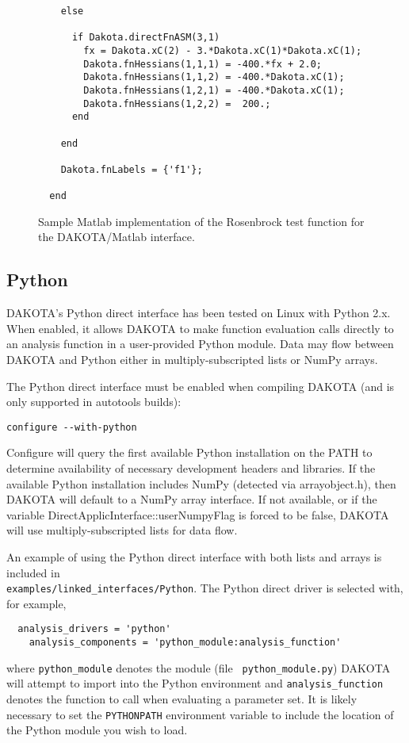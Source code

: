 \begin{figure}
\begin{bigbox}
\begin{tiny}
\begin{verbatim}
    else
    
      if Dakota.directFnASM(3,1) 
        fx = Dakota.xC(2) - 3.*Dakota.xC(1)*Dakota.xC(1);
        Dakota.fnHessians(1,1,1) = -400.*fx + 2.0;
        Dakota.fnHessians(1,1,2) = -400.*Dakota.xC(1); 
        Dakota.fnHessians(1,2,1) = -400.*Dakota.xC(1);
        Dakota.fnHessians(1,2,2) =  200.;
      end
    
    end
  
    Dakota.fnLabels = {'f1'};
   
  end
\end{verbatim}
\end{tiny}
\end{bigbox}
\caption{Sample Matlab implementation of the Rosenbrock test function
for the DAKOTA/Matlab interface.\label{advint:figure:matlabrosen}}
\end{figure}

\subsection{Python}\label{advint:existingdirect:python} 

DAKOTA's Python direct interface has been tested on Linux with Python
2.x.  When enabled, it allows DAKOTA to make function evaluation calls
directly to an analysis function in a user-provided Python module.
Data may flow between DAKOTA and Python either in multiply-subscripted
lists or NumPy arrays.

The Python direct interface must be enabled when compiling DAKOTA (and
is only supported in autotools builds):
\begin{verbatim}
configure --with-python
\end{verbatim}
Configure will query the first available Python installation on the
PATH to determine availability of necessary development headers and
libraries.  If the available Python installation includes NumPy
(detected via arrayobject.h), then DAKOTA will default to a NumPy
array interface.  If not available, or if the variable
DirectApplicInterface::userNumpyFlag is forced to be false, DAKOTA
will use multiply-subscripted lists for data flow.

An example of using the Python direct interface with both lists and
arrays is included in \\
{\tt examples/linked\_interfaces/Python}.  The Python direct driver is
selected with, for example,
\begin{verbatim}
  analysis_drivers = 'python'				
    analysis_components = 'python_module:analysis_function'
\end{verbatim}
where {\tt python\_module} denotes the module (file {\tt
python\_module.py}) DAKOTA will attempt to import into the Python
environment and {\tt analysis\_function} denotes the function to call
when evaluating a parameter set.  It is likely necessary to set the
{\tt PYTHONPATH} environment variable to include the location of the
Python module you wish to load.


